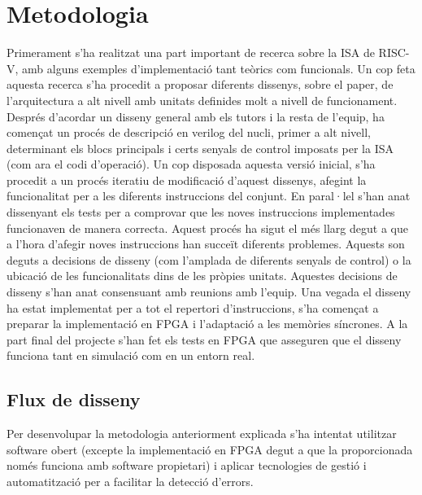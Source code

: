 \documentclass[10pt,a4paper,twocolumn,twoside]{article}
\begin{document}
\section{Metodologia}
\label{sec:Method}
Primerament s'ha realitzat una part important de recerca sobre la ISA de RISC-V, amb alguns exemples d'implementació tant teòrics com funcionals. 
Un cop feta aquesta recerca s'ha procedit a proposar diferents dissenys, sobre el paper, de l'arquitectura a alt nivell amb unitats definides molt a nivell de funcionament. 
Després d'acordar un disseny general amb els tutors i la resta de l'equip, ha començat un procés de descripció en verilog del nucli, primer a alt nivell, determinant els blocs principals i certs senyals de control imposats per la ISA (com ara el codi d'operació). 
Un cop disposada aquesta versió inicial, s'ha procedit a un procés iteratiu de modificació d'aquest dissenys, afegint la funcionalitat per a les diferents instruccions del conjunt. En paral·lel s'han anat dissenyant els tests per a comprovar que les noves instruccions implementades funcionaven de manera correcta. 
Aquest procés ha sigut el més llarg degut a que a l'hora d'afegir noves instruccions han succeït diferents problemes. Aquests son deguts a decisions de disseny (com l'amplada de diferents senyals de control) o la ubicació de les funcionalitats dins de les pròpies unitats. 
Aquestes decisions de disseny s’han anat consensuant amb reunions amb  l'equip. 
Una vegada el disseny ha estat implementat per a tot el repertori d'instruccions, s'ha començat a preparar la implementació en FPGA i l'adaptació a les memòries síncrones. A la part final del projecte s'han fet els tests en FPGA que asseguren que el disseny funciona tant en simulació com en un entorn real.


\subsection{Flux de disseny}  %
Per desenvolupar la metodologia anteriorment explicada s'ha intentat utilitzar software obert (excepte la implementació en FPGA degut a que la proporcionada només funciona amb software propietari) i aplicar tecnologies de gestió i automatització per a facilitar la detecció d'errors. 
\end{document}
